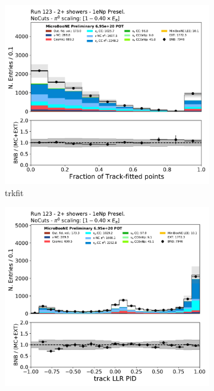 \begin{figure}[H]
    \centering
    \begin{subfigure}{0.3\textwidth}
    \includegraphics[width=1.0\textwidth]{Sidebands/Figures/1eNp/TwoShower/TwoPShr_NP_None_pi0e040/trkfit.pdf}
    \caption{trkfit}
    \end{subfigure}
    \begin{subfigure}{0.3\textwidth}
    \includegraphics[width=1.0\textwidth]{Sidebands/Figures/1eNp/TwoShower/TwoPShr_NP_None_pi0e040/trkpid.pdf}

\end{subfigure}
\end{figure}
